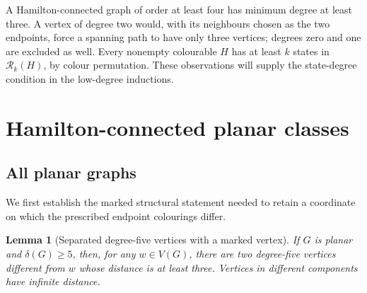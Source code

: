 \documentclass[11pt]{article}
\newtheorem{lemma}[theorem]{Lemma}
\theoremstyle{remark}
\newcommand{\Rk}{\mathcal R_k}
\numberwithin{equation}{section}
\begin{document}
A Hamilton-connected graph of order at least four has minimum degree at
least three.  A vertex of degree two would, with its neighbours chosen
as the two endpoints, force a spanning path to have only three vertices;
degrees zero and one are excluded as well.  Every nonempty colourable
$H$ has at least $k$ states in $\Rk(H)$, by colour permutation.
These observations will supply the state-degree condition in the
low-degree inductions.

\section{Hamilton-connected planar classes}
\label{sec:hc-planar}

\subsection{All planar graphs}

We first establish the marked structural statement needed to retain a
coordinate on which the prescribed endpoint colourings differ.

\begin{lemma}[Separated degree-five vertices with a marked vertex]
\label{lem:marked-five}
If $G$ is planar and $\delta(G)\ge5$, then, for any $w\in V(G)$,
there are two degree-five vertices different from $w$ whose distance is
at least three.  Vertices in different components have infinite distance.
\end{lemma}
\end{document}
